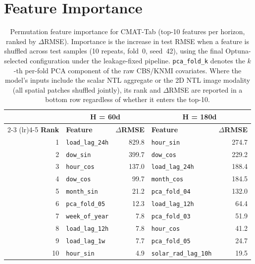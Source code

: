 \section{Feature Importance}
\label{sec:apx:feat_imp}

\begin{table}[h]
\centering
\scriptsize
\caption{Permutation feature importance for CMAT-Tab (top-10
features per horizon, ranked by $\Delta$RMSE). Importance is the increase in
test RMSE when a feature is shuffled across test samples (10 repeats, fold~0,
seed~42), using the final Optuna-selected configuration under the
leakage-fixed pipeline. \texttt{pca\_fold\_k} denotes the $k$-th per-fold PCA
component of the raw CBS/KNMI covariates. Where the model's inputs include the scalar NTL aggregate or the 2D NTL image modality (all spatial patches shuffled jointly), its rank and $\Delta$RMSE are reported in a bottom row regardless of whether it enters the top-10.}
\label{tab:feat_imp_tab}
\begin{tabular}{r l r l r }
\toprule
 & \multicolumn{2}{c}{\textbf{H = 60d}} & \multicolumn{2}{c}{\textbf{H = 180d}} \\
\cmidrule(lr){2-3} \cmidrule(lr){4-5}
\textbf{Rank} & \textbf{Feature} & \textbf{$\Delta$RMSE} & \textbf{Feature} & \textbf{$\Delta$RMSE} \\
\midrule
1 & \texttt{load\_lag\_24h} & 829.8 & \texttt{hour\_sin} & 274.7 \\
2 & \texttt{dow\_sin} & 399.7 & \texttt{dow\_cos} & 229.2 \\
3 & \texttt{hour\_cos} & 137.0 & \texttt{load\_lag\_24h} & 188.4 \\
4 & \texttt{dow\_cos} & 99.7 & \texttt{month\_cos} & 184.5 \\
5 & \texttt{month\_sin} & 21.2 & \texttt{pca\_fold\_04} & 132.0 \\
6 & \texttt{pca\_fold\_05} & 12.3 & \texttt{load\_lag\_12h} & 64.4 \\
7 & \texttt{week\_of\_year} & 7.8 & \texttt{pca\_fold\_03} & 51.9 \\
8 & \texttt{load\_lag\_12h} & 7.8 & \texttt{hour\_cos} & 41.2 \\
9 & \texttt{load\_lag\_1w} & 7.7 & \texttt{pca\_fold\_05} & 24.7 \\
10 & \texttt{hour\_sin} & 4.9 & \texttt{solar\_rad\_lag\_10h} & 19.5 \\
\bottomrule
\end{tabular}
\end{table}

